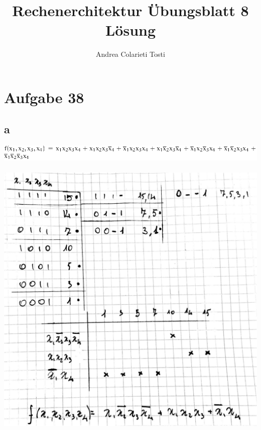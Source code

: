 \documentclass[10pt,a4paper]{article}
\author{Andrea Colarieti Tosti}
\title{Rechenerchitektur Übungsblatt 8 Lösung }
\begin{document}
\maketitle

\section{Aufgabe 38}
\subsection{a}
\includegraphics[scale=0.3]{ra38a1.png} \\\\
\includegraphics[scale=0.13]{ra38a2_1.jpg} \\
\end{document}
